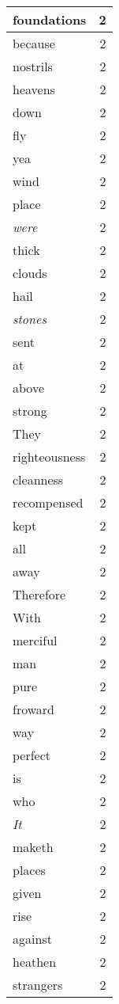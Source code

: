 \begin{center}
\begin{longtable}{l|r}
foundations & 2 \\ \hline
because & 2 \\ \hline
nostrils & 2 \\ \hline
heavens & 2 \\ \hline
down & 2 \\ \hline
fly & 2 \\ \hline
yea & 2 \\ \hline
wind & 2 \\ \hline
place & 2 \\ \hline
\emph{were} & 2 \\ \hline
thick & 2 \\ \hline
clouds & 2 \\ \hline
hail & 2 \\ \hline
\emph{stones} & 2 \\ \hline
sent & 2 \\ \hline
at & 2 \\ \hline
above & 2 \\ \hline
strong & 2 \\ \hline
They & 2 \\ \hline
righteousness & 2 \\ \hline
cleanness & 2 \\ \hline
recompensed & 2 \\ \hline
kept & 2 \\ \hline
all & 2 \\ \hline
away & 2 \\ \hline
Therefore & 2 \\ \hline
With & 2 \\ \hline
merciful & 2 \\ \hline
man & 2 \\ \hline
pure & 2 \\ \hline
froward & 2 \\ \hline
way & 2 \\ \hline
perfect & 2 \\ \hline
is & 2 \\ \hline
who & 2 \\ \hline
\emph{It} & 2 \\ \hline
maketh & 2 \\ \hline
places & 2 \\ \hline
given & 2 \\ \hline
rise & 2 \\ \hline
against & 2 \\ \hline
heathen & 2 \\ \hline
strangers & 2 \\ \hline

\end{longtable}
\end{center}

